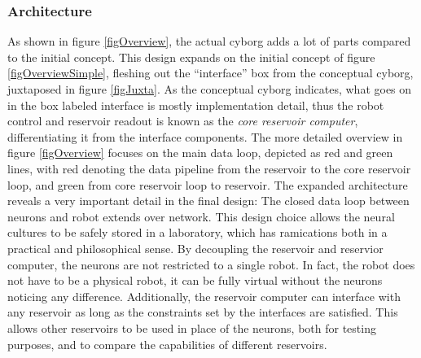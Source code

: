 \subsubsection{Architecture}
As shown in figure \ref{figOverview}, the actual cyborg adds a lot of parts
compared to the initial concept.
This design expands on the initial concept of figure \ref{figOverviewSimple}, fleshing
out the ``interface'' box from the conceptual cyborg, juxtaposed in figure
\ref{figJuxta}.
As the conceptual cyborg indicates, what goes on in the box labeled interface is
mostly implementation detail, thus the robot control and reservoir readout is
known as the \emph{core reservoir computer}, differentiating it from the interface
components.
The more detailed overview in figure \ref{figOverview} focuses on the main data loop, depicted as
red and green lines, with red denoting the data pipeline from the reservoir to
the core reservoir loop, and green from core reservoir loop to reservoir.
The expanded architecture reveals a very important detail in the final design:
The closed data loop between neurons and robot extends over network. 
This design choice allows the neural cultures to be safely stored in a
laboratory, which has ramications both in a practical and philosophical sense.
By decoupling the reservoir and reservior computer, the neurons are not
restricted to a single robot.
In fact, the robot does not have to be a physical robot, it can be fully virtual
without the neurons noticing any difference.
Additionally, the reservoir computer can interface with any reservoir as long as
the constraints set by the interfaces are satisfied.
This allows other reservoirs to be used in place of the neurons, both for
testing purposes, and to compare the capabilities of different reservoirs.
